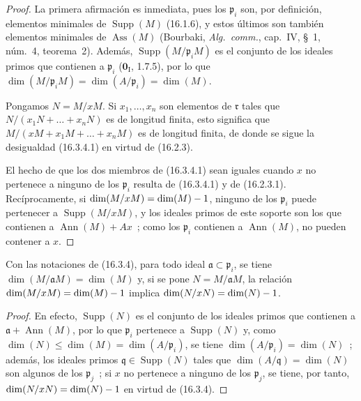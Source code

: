 \begin{proof}
La primera afirmación es inmediata, pues los $\mathfrak{p}_i$ son, por
definición, elementos minimales de $\operatorname{Supp}(M)$ (16.1.6), y estos
últimos son también elementos minimales de $\operatorname{Ass}(M)$ (Bourbaki,
\emph{Alg.~comm.}, cap.~IV, \S~1, núm.~4, teorema~2). Además,
$\operatorname{Supp}(M/\mathfrak{p}_iM)$ es el conjunto de los ideales primos
que contienen a $\mathfrak{p}_i$ ($\mathbf{0}_{\mathrm I}$, 1.7.5), por lo que
$\dim(M/\mathfrak{p}_iM)=\dim(A/\mathfrak{p}_i)=\dim(M)$.

Pongamos $N=M/xM$. Si $x_1,\ldots,x_n$ son elementos de $\mathfrak{r}$ tales
que $N/(x_1N+\ldots+x_nN)$ es de longitud finita, esto significa que
$M/(xM+x_1M+\ldots+x_nM)$ es de longitud finita, de donde se sigue la
desigualdad (16.3.4.1) en virtud de (16.2.3).

El hecho de que los dos miembros de (16.3.4.1) sean iguales cuando $x$ no
pertenece a ninguno de los $\mathfrak{p}_i$ resulta de (16.3.4.1) y de
(16.2.3.1). Recíprocamente, si
$\dim(M/xM)=\dim(M)- 1$, ninguno de los $\mathfrak{p}_i$ puede pertenecer a
$\operatorname{Supp}(M/xM)$, y los ideales primos de este soporte son los que
contienen a $\operatorname{Ann}(M)+Ax$~; como los $\mathfrak{p}_i$ contienen a
$\operatorname{Ann}(M)$, no pueden contener a $x$.
\end{proof}

\begin{corollary}[16.3.5]
\label{0.16.3.5-fr}
Con las notaciones de \textup{(16.3.4)}, para todo ideal
$\mathfrak{a}\subset\mathfrak{p}_i$, se tiene
$\dim(M/\mathfrak{a}M)=\dim(M)$ y, si se pone
$N=M/\mathfrak{a}M$, la relación $\dim(M/xM)=\dim(M)- 1$ implica
$\dim(N/xN)=\dim(N)- 1$.
\end{corollary}

\begin{proof}
En efecto, $\operatorname{Supp}(N)$ es el conjunto de los ideales primos que
contienen a $\mathfrak{a}+\operatorname{Ann}(M)$, por lo que $\mathfrak{p}_i$
pertenece a $\operatorname{Supp}(N)$ y, como
$\dim(N)\leq\dim(M)=\dim(A/\mathfrak{p}_i)$, se tiene
$\dim(A/\mathfrak{p}_i)=\dim(N)$~; además, los ideales primos
$\mathfrak{q}\in\operatorname{Supp}(N)$ tales que
$\dim(A/\mathfrak{q})=\dim(N)$ son algunos de los $\mathfrak{p}_j$~; si $x$
no pertenece a ninguno de los $\mathfrak{p}_j$, se tiene, por tanto,
$\dim(N/xN)=\dim(N)- 1$ en virtud de (16.3.4).
\end{proof}

